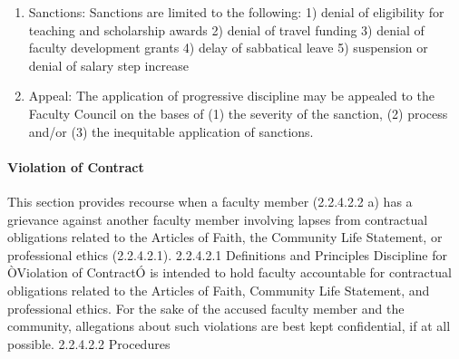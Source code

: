 \documentclass[letterpaper, 11pt]{article}
\begin{document}
\begin{enumerate}[label=\alph*)]
					\item{Sanctions:}
					Sanctions are limited to the following:
					1) denial of eligibility for teaching and scholarship awards
					2) denial of travel funding
					3) denial of faculty development grants
					4) delay of sabbatical leave
					5) suspension or denial of salary step increase
					\item{Appeal:}
					The application of progressive discipline may be appealed to the Faculty Council on the bases of (1) the severity of the sanction, (2) process and/or (3) the inequitable application of sanctions.
				\end{enumerate}
			\paragraph{Violation of Contract}
				This section provides recourse when a faculty member (2.2.4.2.2 a) has a grievance against another faculty member involving lapses from contractual obligations related to the Articles of Faith, the Community Life Statement, or professional ethics (2.2.4.2.1).
				2.2.4.2.1 Definitions and Principles
				Discipline for ÒViolation of ContractÓ is intended to hold faculty accountable for contractual obligations related to the Articles of Faith, Community Life Statement, and professional ethics.  For the sake of the accused faculty member and the community, allegations about such violations are best kept confidential, if at all possible.
				2.2.4.2.2 Procedures
\end{document}
